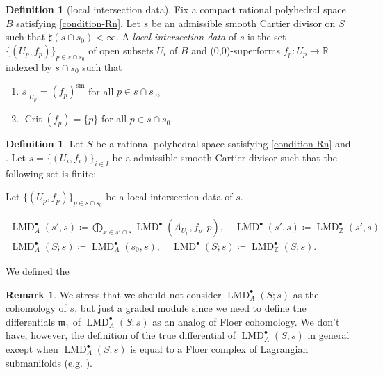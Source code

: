 \documentclass[a4paper,dvipdfmx,reqno,12pt]{amsart}
\theoremstyle{definition}
\newtheorem{definition}[theorem]{Definition}
\newtheorem{remark}[theorem]{Remark}
\newcommand{\deq}{\coloneqq}
\newcommand{\opn}[1]{\operatorname{#1}}
\numberwithin{equation}{section}
\begin{document}
\begin{definition}[{local intersection data}]
Fix a compact rational polyhedral space $B$ satisfying 
\cref{condition-Rn}.
Let $s$ be an admissible smooth Cartier divisor 
on $S$ such that $\sharp (s\cap s_0)<\infty$. 
A \emph{local intersection data} of $s$ is the set 
$\{(U_p,f_p)\}_{p\in s\cap s_0}$ of open subsets
$U_i$ of $B$ and (0,0)-superforms
$f_p\colon U_p \to \mathbb{R}$ indexed by 
$ s\cap s_0$ 
such that
\begin{enumerate}
\item $s|_{U_p}=(f_p)^{\mathrm{sm}}$
for all $p\in s\cap s_0$,
\item $\opn{Crit}(f_p)=\{p\}$ for all $p\in s\cap s_0$.
\end{enumerate}
\end{definition}


\begin{definition}
Let $S$ be a rational polyhedral space 
satisfying \cref{condition-Rn} and 
.
Let $s=\{(U_i,f_i)\}_{i\in I}$ be a admissible smooth Cartier divisor such that
the following set is finite;


Let $\{(U_p,f_p)\}_{p\in s\cap s_0}$ 
be a local intersection data of $s$.

\begin{align}
\opn{LMD}^{\bullet}_{A}(s',s)\deq 
\bigoplus_{x\in s' \cap s} 
\opn{LMD}^{\bullet}(A_{U_p},f_{p},p), \quad 
\opn{LMD}^{\bullet}(s',s)
\deq \opn{LMD}^{\bullet}_{\mathbb{Z}}(s',s)\\
\opn{LMD}^{\bullet}_A(S;s)
\deq \opn{LMD}^{\bullet}_{A}(s_0,s), \quad
\opn{LMD}^{\bullet}(S;s)\deq
\opn{LMD}^{\bullet}_{\mathbb{Z}}(S;s).
\end{align}
\end{definition}

We defined the 

\begin{remark}
\label{remark-differential-graded-module}
We stress that we should not consider 
$\opn{LMD}^{\bullet}_{A}(S;s)$ as the cohomology of $s$,
but just
a graded module 
since we need to define the differentials 
$\mathfrak{m}_1$ of 
$\opn{LMD}^{\bullet}_{A}(S;s)$ as an analog of
Floer cohomology. We don't have, however,
the definition of the true differential of 
$\opn{LMD}^{\bullet}_A(S;s)$ in general except when
$\opn{LMD}^{\bullet}_{A}(S;s)$ is equal to a Floer complex
of Lagrangian submanifolds (e.g. \cite[5.2]{MR1882331}).
\end{remark}
\end{document}
